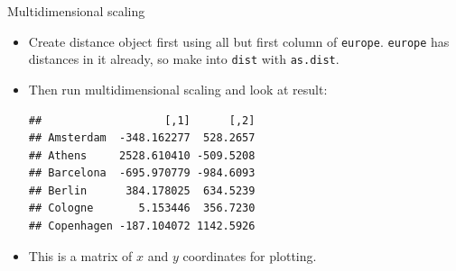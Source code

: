 \begin{frame}[fragile]{Multidimensional scaling}

  \begin{itemize}
  \item Create distance object first using all but first column of
\texttt{europe}. \texttt{europe} has distances in it already, so make
into \texttt{dist} with \texttt{as.dist}.
\item Then run multidimensional scaling and look at result:
  
\begin{knitrout}
\color{fgcolor}\begin{kframe}
\begin{alltt}
\hlkwb{=}\hlstd{(europe[,}\hlopt{-}\hlstd{])}
\hlkwb{=}
\end{alltt}
\begin{verbatim}
##                   [,1]      [,2]
## Amsterdam  -348.162277  528.2657
## Athens     2528.610410 -509.5208
## Barcelona  -695.970779 -984.6093
## Berlin      384.178025  634.5239
## Cologne       5.153446  356.7230
## Copenhagen -187.104072 1142.5926
\end{verbatim}
\end{kframe}
\end{knitrout}

\item This is a matrix of $x$ and $y$ coordinates for plotting.

  \end{itemize}
\end{frame}

